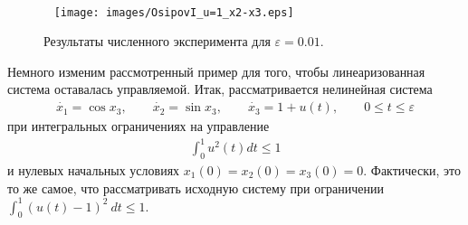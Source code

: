 \documentclass[../main.tex]{subfiles}
\begin{document}
\begin{figure}[ht!]
\begin{minipage}[b]{.49\linewidth}
            \label{fig:u=0_x2-x3} 
        \end{minipage}
        \hfill
        \begin{minipage}[b]{.49\linewidth} 
            \small
            \centering
            \texttt{[image: images/OsipovI\_u=1\_x2-x3.eps]}
            \label{fig:u=1_x2-x3}  
        \end{minipage}
        \caption{Результаты численного эксперимента для $ \varepsilon = 0.01 $.}\label{fig:RS}
    \end{figure}
    
    Немного изменим рассмотренный пример для того, чтобы линеаризованная система оставалась управляемой. 
Итак, рассматривается нелинейная система
    \begin{gather}\label{unicycle1}
        \dot{x_1} = \cos x_3, \qquad
        \dot{x_2} = \sin x_3, \qquad
        \dot{x_3} = 1 + u(t), \qquad 0 \leqslant t \leqslant \varepsilon
    \end{gather}
    при интегральных ограничениях на управление 
    \begin{gather*}
        \int_0^1 u^2(t) dt \leqslant 1
    \end{gather*}
    и нулевых начальных условиях $ x_1(0) = x_2(0) = x_3(0) = 0 $. 
Фактически, это то же самое, что рассматривать исходную систему при ограничении $ \displaystyle{\int_0^1} \left( u(t) - 1\right)^2 \ dt \leqslant 1$.
    
\end{document}
